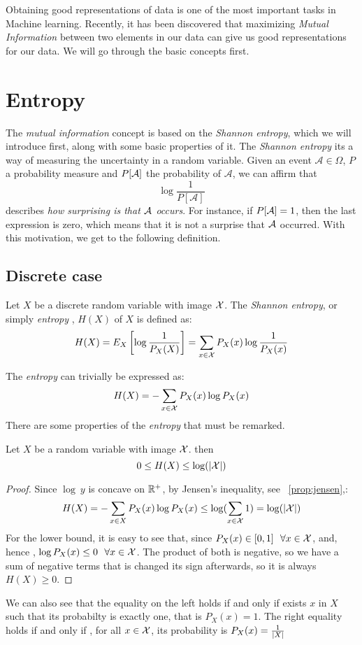 Obtaining good representations of data is one of the most important tasks in Machine learning. 
Recently, it has been discovered that maximizing \emph{Mutual Information} between two elements in our data can give us good representations for our data. We will go through the basic concepts first.


\section{Entropy}

The \emph{mutual information} concept is based on the \emph{Shannon entropy}, which we will introduce first, along with some basic properties of it. The \emph{Shannon entropy} its a way of measuring the uncertainty in a random variable. Given an event $\mathcal A \in \Omega$, $P$ a probability measure and $P[\mathcal A]$ the probability of $\mathcal A$, we can affirm that 
$$
\log\frac{1}{P[\mathcal A]}
$$
describes \emph{how surprising is that $\mathcal A$ occurs}. For instance, if $P[\mathcal A] = 1$, then the last expression is zero, which means that it is not a surprise that $\mathcal A$ occurred. With this motivation, we get to the following definition.

\subsection{Discrete case}

\begin{ndef}
Let $X$ be a discrete random variable with image $\mathcal{X}$. The \emph{Shannon entropy}, or simply \emph{entropy} , $H(X)$ of $X$ is defined as:
$$
H(X) = E_X\left[\log\frac{1}{P_X(X)}\right] =  \sum_{x \in \mathcal{X}} P_X(x) \log\frac{1}{P_X(x)}
$$
\end{ndef}
The \emph{entropy} can trivially be expressed as:
$$
H(X) = - \sum_{x \in \mathcal{X}}P_X (x)\log P_X(x)
$$
There are some properties of the \emph{entropy} that must be remarked. 
\begin{nprop}\label{entr:prop:1}
    Let $X$ be a random variable with image $\mathcal{X}$. then
    $$
0 \leq H(X) \leq \log(|\mathcal{X}|)
    $$
\end{nprop}
\begin{proof}
    Since $\log \ y$ is concave on $\mathbb{R}^+$, by Jensen's inequality, see ~\ref{prop:jensen},:
    $$
    H(X) = - \sum_{x \in X}P_X (x)\log P_X(x) \leq \log(\sum_{x \in \mathcal{X}} 1) = \log(|\mathcal{X}|)
    $$
    For the lower bound, it is easy to see that, since $P_X(x) \in [0,1] \ \  \forall x \in \X $, and, hence , $\log P_X(x) \leq 0 \ \ \forall x \in \mathcal{X}$. The product of both is negative, so we have a sum of negative terms that is changed its sign afterwards, so it is always $H(X) \geq 0$. 
\end{proof}
We can also see that the equality on the left holds if and only if exists $ x $ in  $X$ such that its probabilty is exactly one, that is $P_X(x) = 1$. The right equality holds if and only if , for all $x \in \mathcal{X}$, its probability is $P_X(x) = \frac{1}{\lvert X\rvert}$

